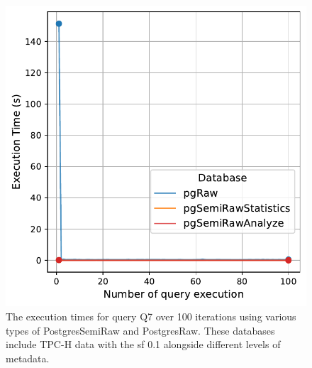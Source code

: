 \begin{figure}[hbt!]
\centering
\includegraphics[width=1.0\linewidth]{charts-eval-exp-time-stat/execution_time_db_type_Q7.pdf}
\caption[Q7:result]{The execution times for query Q7 over 100 iterations using various types of PostgresSemiRaw and PostgresRaw. These databases include TPC-H data with the \acrshort{sf} 0.1 alongside different levels of metadata.}
\label{fig:execution_time_db_type_Q7}
\end{figure}
